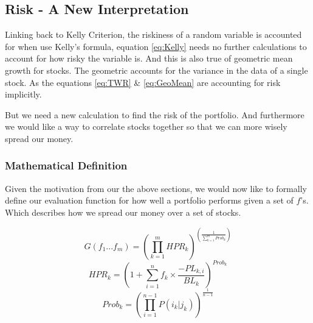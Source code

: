 \documentclass[11pt]{article}
\begin{document}
\subsection{Risk - A New Interpretation}

    Linking back to Kelly Criterion, the riskiness of a random variable is accounted for
    when use Kelly's formula, equation \ref{eq:Kelly} needs no further calculations
    to account for how risky the variable is. And this is also true of geometric mean growth
    for stocks. The geometric accounts for the variance in the data of a single stock. As the
    equations \ref{eq:TWR} \& \ref{eq:GeoMean} are accounting for risk implicitly.

    But we need a new calculation to find the risk of the portfolio. And furthermore we would
    like a way to correlate stocks together so that we can more wisely spread our money.

\subsubsection{Mathematical Definition}

    Given the motivation from our the above sections, we would now like to formally define our
    evaluation function for how well a portfolio performs given a set of \(f\)'s. Which describes
    how we spread our money over a set of stocks.

    \begin{equation}\label{eq:G}
        G(f_1...f_m) = \left( \displaystyle\prod^{m}_{k=1} HPR_k \right) ^{ \left( \displaystyle\frac{1}{\sum^{m}_{k=1}Prob_k} \right)}
    \end{equation}
    \begin{equation}\label{eq:HPR_k}
        HPR_k = \left( 1 +  \displaystyle\sum^{n}_{i=1} f_k \times \frac{- PL_{k,i}}{BL_k} \right) ^{Prob_k}
    \end{equation}
    \begin{equation}\label{eq:Prob_k}
        Prob_k = \left( \displaystyle\prod^{n - 1}_{i=1} P(i_k | j_k)\right)^{\frac{1}{n - 1}}
    \end{equation}
\end{document}
